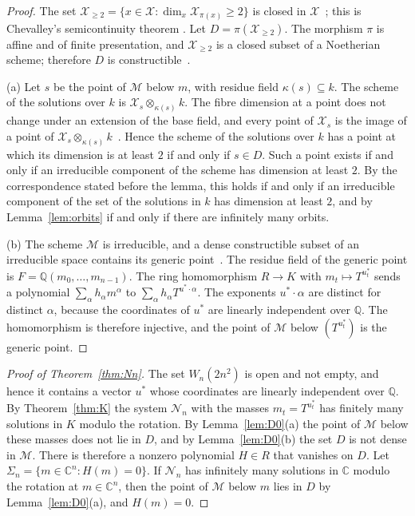 \documentclass[11pt]{amsart}
\theoremstyle{definition}
\theoremstyle{remark}
\numberwithin{equation}{section}
\newcommand{\QQ}{\mathbb{Q}}
\newcommand{\CC}{\mathbb{C}}
\newcommand{\cN}{\mathcal{N}}
\newcommand{\cX}{\mathcal{X}}
\newcommand{\cM}{\mathcal{M}}
\begin{document}
\begin{proof}
The set $\cX_{\ge 2} = \{ x \in \cX : \dim_x \cX_{\pi(x)} \ge 2 \}$ is closed in
$\cX$~\cite[Tag~02FZ]{stacks}; this is Chevalley's semicontinuity theorem \cite[13.1.3]{ega4iii}. Let
$D = \pi(\cX_{\ge 2})$. The morphism $\pi$ is affine and of finite presentation, and $\cX_{\ge 2}$ is a
closed subset of a Noetherian scheme; therefore $D$ is constructible~\cite[Tag~054K]{stacks}.

(a) Let $s$ be the point of $\cM$ below $m$, with residue field $\kappa(s) \subseteq k$. The scheme of
the solutions over $k$ is $\cX_s \otimes_{\kappa(s)} k$. The fibre dimension at a point does not
change under an extension of the base field, and every point of $\cX_s$ is the image of a point of
$\cX_s \otimes_{\kappa(s)} k$~\cite[Tag~02FY, parts (1) and (3)]{stacks}. Hence the scheme of the
solutions over $k$ has a point at which its dimension is at least $2$ if and only if $s \in D$. Such a
point exists if and only if an irreducible component of the scheme has dimension at least $2$. By the
correspondence stated before the lemma, this holds if and only if an irreducible component of the set
of the solutions in $k$ has dimension at least $2$, and by Lemma~\ref{lem:orbits} if and only if there
are infinitely many orbits.

(b) The scheme $\cM$ is irreducible, and a dense constructible subset of an irreducible space contains
its generic point~\cite[Tag~005K]{stacks}. The residue field of the generic point is
$F = \QQ(m_0, \dots, m_{n-1})$. The ring homomorphism $R \to K$ with $m_t \mapsto T^{u^{*}_t}$ sends a
polynomial $\sum_{\alpha} h_\alpha m^{\alpha}$ to $\sum_{\alpha} h_\alpha T^{u^{*} \cdot \alpha}$. The
exponents $u^{*} \cdot \alpha$ are distinct for distinct $\alpha$, because the coordinates of $u^{*}$ are
linearly independent over $\QQ$. The homomorphism is therefore injective, and the point of $\cM$ below
$(T^{u^{*}_t})$ is the generic point.
\end{proof}

\begin{proof}[Proof of Theorem~\ref{thm:Nn}]
The set $W_n(2n^2)$ is open and not empty, and hence it contains a vector $u^{*}$ whose coordinates are
linearly independent over $\QQ$. By Theorem~\ref{thm:K} the system $\cN_n$ with the masses
$m_t = T^{u^{*}_t}$ has finitely many solutions in $K$ modulo the rotation. By Lemma~\ref{lem:D0}(a) the
point of $\cM$ below these masses does not lie in $D$, and by Lemma~\ref{lem:D0}(b) the set $D$ is not
dense in $\cM$. There is therefore a nonzero polynomial $H \in R$ that vanishes on $D$. Let
$\Sigma_n = \{ m \in \CC^n : H(m) = 0 \}$. If $\cN_n$ has infinitely many solutions in $\CC$ modulo the
rotation at $m \in \CC^n$, then the point of $\cM$ below $m$ lies in $D$ by Lemma~\ref{lem:D0}(a), and
$H(m) = 0$.
\end{proof}
\end{document}
